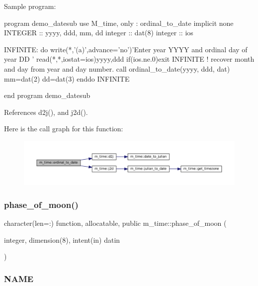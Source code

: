 \begin{DoxyVerb}Sample program:

 program demo_datesub
 use M_time, only : ordinal_to_date
 implicit none
 INTEGER            :: yyyy, ddd, mm, dd
 integer            :: dat(8)
 integer            :: ios

   INFINITE: do
      write(*,'(a)',advance='no')'Enter year YYYY and ordinal day of year DD '
      read(*,*,iostat=ios)yyyy,ddd
      if(ios.ne.0)exit INFINITE
      ! recover month and day from year and day number.
      call ordinal_to_date(yyyy, ddd, dat)
      mm=dat(2)
      dd=dat(3)
    enddo INFINITE

 end program demo_datesub \end{DoxyVerb}
 

References d2j(), and j2d().

Here is the call graph for this function\+:\nopagebreak
\begin{figure}[H]
\begin{center}
\leavevmode
\includegraphics[width=350pt]{namespacem__time_aa4dca4409bf20a011bb04988c1335d63_cgraph}
\end{center}
\end{figure}
\mbox{\label{namespacem__time_ab8a976e2f113cc38b6df80974cee55dc}} 
\subsubsection{\texorpdfstring{phase\+\_\+of\+\_\+moon()}{phase\_of\_moon()}}
{\footnotesize\ttfamily character(len=\+:) function, allocatable, public m\+\_\+time\+::phase\+\_\+of\+\_\+moon (\begin{DoxyParamCaption}\item[{integer, dimension(8), intent(in)}]{datin }\end{DoxyParamCaption})}



\subsubsection*{N\+A\+ME}

